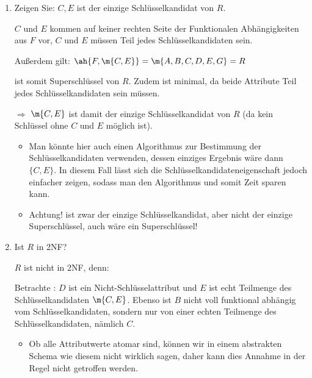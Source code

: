 \documentclass{bschlangaul-aufgabe}
\begin{document}
\begin{enumerate}


\item Zeigen Sie: ${C, E}$ ist der einzige Schlüsselkandidat von $R$.

\begin{bAntwort}
$C$ und $E$ kommen auf keiner rechten Seite der Funktionalen
Abhängigkeiten aus $F$ vor, \dh $C$ und $E$ müssen Teil jedes
Schlüsselkandidaten sein.

Außerdem gilt: $\ah{F, \m{C, E}} = \m{A, B, C, D, E, G} = R$

 ist somit Superschlüssel von $R$. Zudem ist 
minimal, da beide Attribute Teil jedes Schlüsselkandidaten sein müssen.

$\Rightarrow$ $\m{C, E}$ ist damit der einzige Schlüsselkandidat von $R$
(da kein Schlüssel ohne $C$ und $E$ möglich ist).


\begin{itemize}
\item Man könnte hier auch einen Algorithmus zur Bestimmung der
Schlüsselkandidaten verwenden, dessen einziges Ergebnis wäre dann $\{C,
E\}$. In diesem Fall lässt sich die Schlüsselkandidateneigenschaft
jedoch einfacher zeigen, sodass man den Algorithmus und somit Zeit
sparen kann.

\item Achtung!  ist zwar der einzige Schlüsselkandidat, aber
nicht der einzige Superschlüssel, auch  wäre ein
Superschlüssel!
\end{itemize}

\end{bAntwort}


\item Ist $R$ in 2NF?

\begin{bAntwort}
$R$ ist nicht in 2NF, denn:

Betrachte : $D$ ist ein Nicht-Schlüsselattribut und $E$
ist echt Teilmenge des Schlüsselkandidaten $\m{C, E}$.
%
Ebenso ist $B$ nicht voll funktional abhängig vom Schlüsselkandidaten,
sondern nur von einer echten Teilmenge des Schlüsselkandidaten, nämlich
$C$.


\begin{itemize}
\item Ob alle Attributwerte atomar sind, können wir in einem abstrakten
Schema wie diesem nicht wirklich sagen, daher kann dies Annahme in der
Regel nicht getroffen werden.


\end{itemize}
\end{bAntwort}
\end{enumerate}
\end{document}
